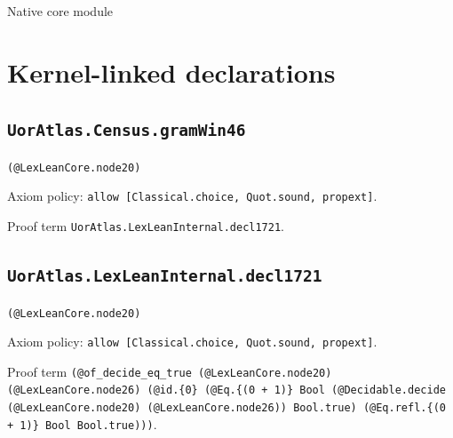 \documentclass[11pt]{article}
\begin{document}
\begin{center}{\LARGE Native core module}\end{center}
\section*{Kernel-linked declarations}
\subsection*{\texttt{UorAtlas.Census.gramWin46}}
\noindent\texttt{(@LexLeanCore.node20)}\par
\noindent Axiom policy: \texttt{allow [Classical.choice, Quot.sound, propext]}.\par
\noindent Proof term \texttt{UorAtlas.LexLeanInternal.decl1721}.\par
\subsection*{\texttt{UorAtlas.LexLeanInternal.decl1721}}
\noindent\texttt{(@LexLeanCore.node20)}\par
\noindent Axiom policy: \texttt{allow [Classical.choice, Quot.sound, propext]}.\par
\noindent Proof term \texttt{(@of\_decide\_eq\_true (@LexLeanCore.node20) (@LexLeanCore.node26) (@id.\{0\} (@Eq.\{(0 + 1)\} Bool (@Decidable.decide (@LexLeanCore.node20) (@LexLeanCore.node26)) Bool.true) (@Eq.refl.\{(0 + 1)\} Bool Bool.true)))}.\par
\end{document}
